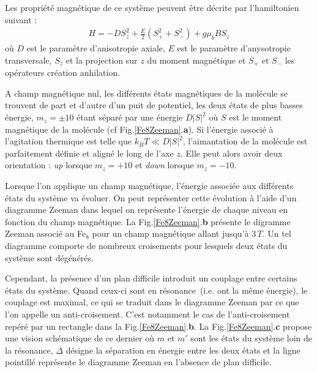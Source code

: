 Les propriété magnétique de ce système peuvent \^etre décrite par l'hamiltonien suivant :
\begin{eqnarray}
H =  -DS_z^2 + \frac{E}{2} ( S_+^2  + S_-^2) + g\mu_b B S_z 
\end{eqnarray}
où $D$ est le paramètre d'anisotropie axiale, $E$ est le paramètre d'anysotropie transversale, $S_z$ et la projection sur $z$ du moment magnétique et $S_+$ et $S_-$ les opérateurs création anhilation.

A champ magnétique nul, les différents états magnétiques de la molécule se trouvent de part et d'autre d'un puit de potentiel, les deux états de plus basses énergie, $m_z=\pm10$ étant séparé par une énergie $D|S|^2$ où $S$ est le moment magnétique de la molécule (cf Fig.\ref{Fe8Zeeman}.\textbf{a}). Si l'énergie associé à l'agitation thermique est telle que $k_BT \ll D|S|^2$, l'aimantation de la molécule est parfaitement définie et aligné le long de l'axe $z$. Elle peut alors avoir deux orientation : \textit{up} lorsque $m_z=+10$ et \textit{down} lorsque $m_z=-10$.

Lorsque l'on applique un champ magnétique, l'énergie associée aux différents états du système va évoluer. On peut représenter cette évolution à l'aide d'un diagramme Zeeman dans lequel on représente l'énergie de chaque niveau en fonction du champ magnétique. La Fig.\ref{Fe8Zeeman}.\textbf{b} présente le digramme Zeeman associé au Fe$_8$ pour un champ magnétique allant jusqu'à $3\,T$. Un tel diagramme comporte de nombreux croisements pour lesquels deux états du système sont dégénérés.

Cependant, la présence d'un plan difficile introduit un couplage entre certains états du système. Quand ceux-ci sont en résonance~(i.e. ont la m\^eme énergie), le couplage est maximal, ce qui se traduit dans le diagramme Zeeman par ce que l'on appelle un anti-croisement. C'est notamment le cas de l'anti-croisement repéré par un rectangle dans la Fig.\ref{Fe8Zeeman}.\textbf{b}. La Fig.\ref{Fe8Zeeman}.\textbf{c} propose une vision schématique de ce dernier où $m$ et $m'$ sont les états du système loin de la résonance, $\Delta$ désigne la séparation en énergie entre les deux états et la ligne pointillé représente le diagramme Zeeman en l'absence de plan difficile.

